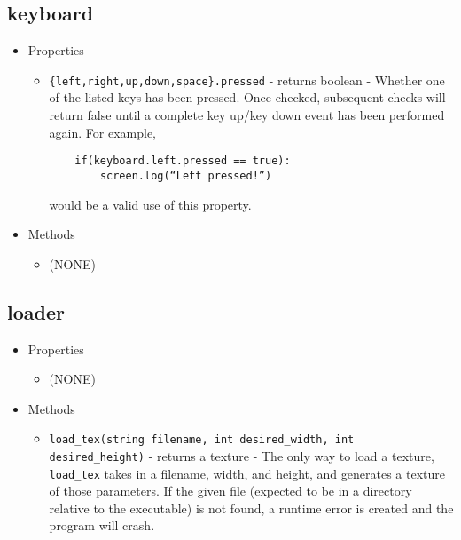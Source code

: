\documentclass[titlepage]{article}
\begin{document}
\subsection{keyboard} 

\begin{itemize}
\item  Properties
\begin{itemize}
\item \verb|{left,right,up,down,space}.pressed| - returns boolean - Whether one of the listed keys has been pressed. Once checked, subsequent checks will return false until a complete key up/key down event has been performed again. For example,
\begin{verbatim}
    if(keyboard.left.pressed == true):
        screen.log(“Left pressed!”)
\end{verbatim}
would be a valid use of this property.

\end{itemize}

\item Methods
\begin{itemize}
\item (NONE)
\end{itemize}
\end{itemize}

\subsection{loader} 

\begin{itemize}
\item  Properties
\begin{itemize}
\item (NONE)
\end{itemize}

\item Methods
\begin{itemize}
\item \verb|load_tex(string filename, int desired_width, int desired_height)| - returns a texture - The only way to load a texture, \verb|load_tex| takes in a filename, width, and height, and generates a texture of those parameters. If the given file (expected to be in a directory relative to the executable) is not found, a runtime error is created and the program will crash.
\end{itemize}
\end{itemize}
\end{document}
